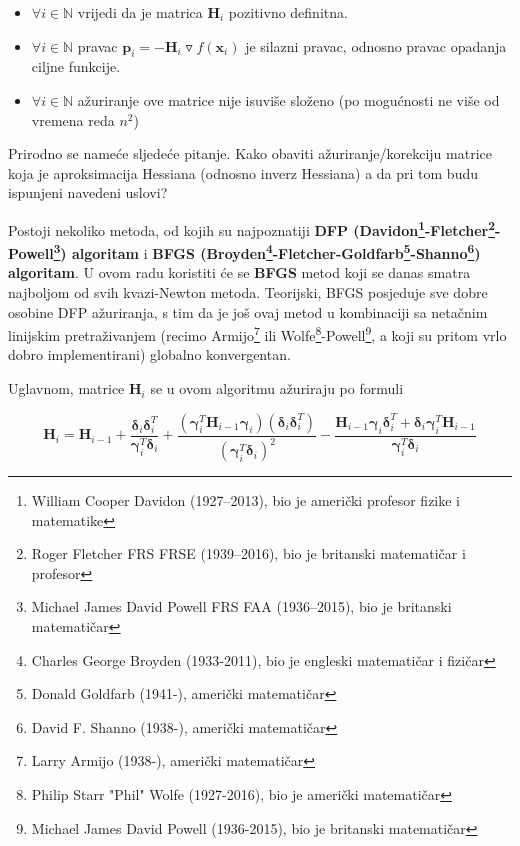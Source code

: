 \documentclass[bosnian,12pt,a4paper]{report}
\begin{document}
	\begin{itemize}
		\item $\forall i \in \mathbb{N}$ vrijedi da je matrica $\textbf{H}_i$ pozitivno definitna.
		\item $\forall i \in \mathbb{N}$ pravac $\textbf{p}_i = - \textbf{H}_i \triangledown f(\textbf{x}_i)$ je silazni pravac, odnosno pravac opadanja ciljne funkcije.
		\item $\forall i \in \mathbb{N}$ ažuriranje ove matrice nije isuviše složeno (po mogućnosti ne više od vremena reda $n^2$)
	\end{itemize}
	
	\vspace{1cm}
	Prirodno se nameće sljedeće pitanje. Kako obaviti ažuriranje/korekciju matrice koja je aproksimacija Hessiana (odnosno inverz Hessiana) a da pri tom budu ispunjeni navedeni uslovi?
	
	\vspace{0.5cm}
	Postoji nekoliko metoda, od kojih su najpoznatiji \textbf{DFP (Davidon\footnote{William Cooper Davidon (1927–2013), bio je američki profesor fizike i matematike}-Fletcher\footnote{Roger Fletcher FRS FRSE (1939–2016), bio je britanski matematičar i profesor}-Powell\footnote{Michael James David Powell FRS FAA (1936–2015), bio je britanski matematičar}) algoritam} i \textbf{BFGS (Broyden\footnote{Charles George Broyden (1933-2011), bio je engleski matematičar i fizičar}-Fletcher-Goldfarb\footnote{Donald Goldfarb (1941-), američki matematičar}-Shanno\footnote{David F. Shanno (1938-), američki matematičar}) algoritam}. U ovom radu koristiti će se \textbf{BFGS} metod koji se danas smatra najboljom od svih kvazi-Newton metoda. Teorijski, BFGS posjeduje sve dobre osobine DFP ažuriranja, s tim da je još ovaj metod u kombinaciji sa netačnim linijskim pretraživanjem (recimo Armijo\footnote{Larry Armijo (1938-), američki matematičar} ili Wolfe\footnote{Philip Starr "Phil" Wolfe (1927-2016), bio je američki matematičar}-Powell\footnote{Michael James David Powell (1936-2015), bio je britanski matematičar}, a koji su pritom vrlo dobro implementirani) globalno konvergentan. 
	
	\vspace{1cm}
	Uglavnom, matrice $\textbf{H}_i$ se u ovom algoritmu ažuriraju po formuli
	
	$$\textbf{H}_i = \textbf{H}_{i-1} + \frac{\pmb{\delta}_i \pmb{\delta}_i ^T}{\pmb{\gamma}_i ^T \pmb{\delta}_i} + \frac{(\pmb{\gamma}_i ^T \textbf{H}_{i-1} \pmb{\gamma}_i)(\pmb{\delta}_i \pmb{\delta}_i ^T)}{(\pmb{\gamma}_i ^T \pmb{\delta}_i)^2} - \frac{\textbf{H}_{i-1}\pmb{\gamma}_i\pmb{\delta}_i^T + \pmb{\delta}_i\pmb{\gamma}_i^T \textbf{H}_{i-1}}{\pmb{\gamma}_i ^T \pmb{\delta}_i}$$
	
\end{document}
